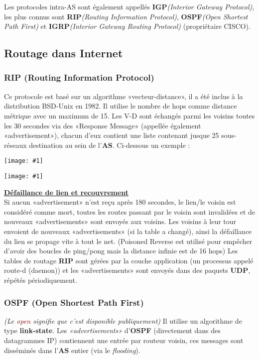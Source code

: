 \documentclass{article}
\newcommand{\red}[1]{\textcolor{darkred}{#1}}
\newcommand{\imgR}[2]{\begin{center}\texttt{[image: \#1]}\end{center}}
\begin{document}
Les protocoles intra-AS sont également appellés \textbf{IGP}\textit{(Interior Gateway Protocol)}, les plus connus 
sont \textbf{RIP}\textit{(Routing Information Protocol)}, \textbf{OSPF}\textit{(Open Shortest Path First)} et 
\textbf{IGRP}\textit{(Interior Gateway Routing Protocol)} (propriétaire CISCO).

\subsection{Routage dans Internet}

\subsubsection{RIP (Routing Information Protocol)}

Ce protocole est basé sur un algorithme «vecteur-distance», il a été inclus à la distribution BSD-Unix en 1982. Il
utilise le nombre de hops comme distance métrique avec un maximum de 15. Les V-D sont échangés parmi les voisins 
toutes les 30 secondes via des «Response Message» (appellée également «advertisement»), chacun d'eux contient
une liste contenant jusque 25 sous-réseaux destination au sein de l'\textbf{AS}. Ci-dessous un exemple :

\imgR{CN_092.png}{300} 

\imgR{CN_093.png}{300}

\textbf{\underline{Défaillance de lien et recouvrement}} \\

Si aucun «advertisement» n'est reçu après 180 secondes, le lien/le voisin est considéré comme mort, toutes les
routes passant par le voisin sont invalidées et de nouveaux «advertisements» sont envoyés aux voisins. Les 
voisins à leur tour envoient de nouveaux «advertisements» (si la table a changé), ainsi la défaillance du lien se
propage vite à tout le net. (Poisoned Reverse est utilisé pour empêcher d'avoir des boucles de ping/pong mais la
distance infinie est de 16 hops) Les tables de routage \textbf{RIP} sont gérées par la couche application (un 
processus appelé route-d (daemon)) et les «advertisements» sont envoyés dans des paquets \textbf{UDP}, répétés
périodiquement.

\subsubsection{OSPF (Open Shortest Path First)}

\textit{(Le \red{open} signifie que c'est disponible publiquement)} Il utilise un algorithme de type 
\textbf{link-state}. Les \textit{«advertisements»} d'\textbf{OSPF} (directement dans des datagrammes
IP) contiennent une entrée par routeur voisin, ces messages sont disséminés dans l'\textbf{AS} entier (via le 
\textit{flooding}).\\
\end{document}
